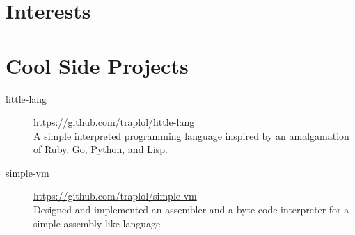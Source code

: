 \documentclass[10pt]{article} %
\begin{document}
\vspace{-5mm}
\section{Interests}
\vspace{-3mm}


\section{Cool Side Projects}
\vspace{-3mm}

\begin{description}

\item[little-lang]
{\footnotesize \href{https://github.com/traplol/little-lang}{https://github.com/traplol/little-lang}} \\
A simple interpreted programming language inspired by an amalgamation of Ruby, Go, Python, and Lisp.

\item[simple-vm]
{\footnotesize \href{https://github.com/traplol/simple-vm}{https://github.com/traplol/simple-vm}} \\
Designed and implemented an assembler and a byte-code interpreter for a simple assembly-like language

\end{description}
\end{document}
